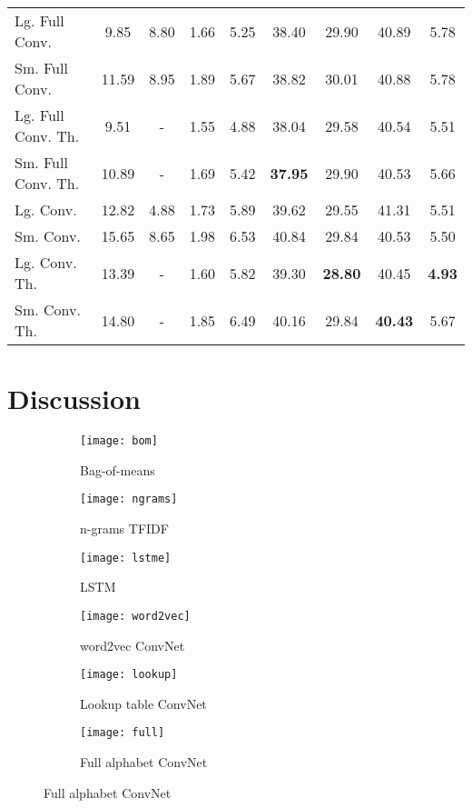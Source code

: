 \documentclass{article} \usepackage{nips15submit_e,times}
\newenvironment{centerverbatim}{\par
  \centering
  \varwidth{\linewidth}\verbatim
}{\endverbatim
  \endvarwidth
  \par
}
\begin{document}
\begin{centerverbatim}
\begin{table}[t]
\begin{center}
\begin{tabular}{lcccccccc}
      Lg. Full Conv. & 9.85 & 8.80 & 1.66 & 5.25 & 38.40 & 29.90 & 40.89 & 5.78 \\
      Sm. Full Conv. & 11.59 & 8.95 & 1.89 & 5.67 & 38.82 & 30.01 & 40.88 & 5.78 \\
      Lg. Full Conv. Th. & 9.51 & - & 1.55 & 4.88 & 38.04 & 29.58 & 40.54 & 5.51 \\
      Sm. Full Conv. Th. & 10.89 & - & 1.69 & 5.42 & \color{blue}\textbf{37.95} & 29.90 & 40.53 & 5.66 \\
      Lg. Conv. & 12.82 & 4.88 & 1.73 & 5.89 & 39.62 & 29.55 & 41.31 & 5.51 \\
      Sm. Conv. & 15.65 & 8.65 & 1.98 & 6.53 & 40.84 & 29.84 & 40.53 & 5.50 \\
      Lg. Conv. Th. & 13.39 & - & 1.60 & 5.82 & 39.30 & \color{blue}\textbf{28.80} & 40.45 & \color{blue}\textbf{4.93} \\
      Sm. Conv. Th. & 14.80 & - & 1.85 & 6.49 & 40.16 & 29.84 & \color{blue}\textbf{40.43} & 5.67 \\
    \end{tabular}
  \end{center}
\end{table}

\section{Discussion}

\begin{figure}[ht]
  \centering
  \begin{subfigure}[b]{0.3\textwidth}
    \texttt{[image: bom]}
    \caption{Bag-of-means}
    \label{fig:bome}
  \end{subfigure}
  \begin{subfigure}[b]{0.3\textwidth}
    \texttt{[image: ngrams]}
    \caption{n-grams TFIDF}
    \label{fig:ngrm}
  \end{subfigure}
  \begin{subfigure}[b]{0.3\textwidth}
    \texttt{[image: lstme]}
    \caption{LSTM}
    \label{fig:lste}
  \end{subfigure}

  \begin{subfigure}[b]{0.3\textwidth}
    \texttt{[image: word2vec]}
    \caption{word2vec ConvNet}
    \label{fig:w2ve}
  \end{subfigure}
  \begin{subfigure}[b]{0.3\textwidth}
    \texttt{[image: lookup]}
    \caption{Lookup table ConvNet}
    \label{fig:look}
  \end{subfigure}
  \begin{subfigure}[b]{0.3\textwidth}
    \texttt{[image: full]}
    \caption{Full alphabet ConvNet}
    \label{fig:full}
  \end{subfigure}


\end{figure}
\end{centerverbatim}
\end{document}
